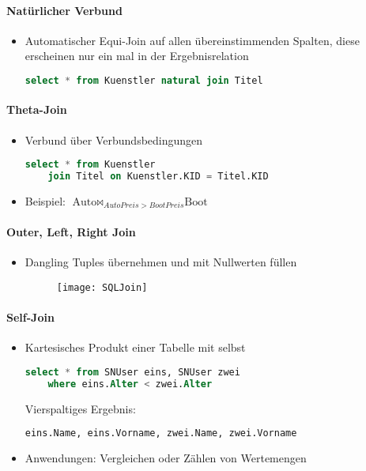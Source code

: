 \paragraph{Natürlicher Verbund}
\begin{itemize}
	\item Automatischer Equi-Join auf allen übereinstimmenden Spalten, diese erscheinen nur ein mal in der Ergebnisrelation
	\begin{lstlisting}[language=sql]
select * from Kuenstler natural join Titel
	\end{lstlisting}
\end{itemize}

\paragraph{Theta-Join}
\begin{itemize}
	\item Verbund über Verbundsbedingungen
	\begin{lstlisting}[language=sql]
select * from Kuenstler 
	join Titel on Kuenstler.KID = Titel.KID
	\end{lstlisting}
	\item Beispiel: \(  \text{Auto} \bowtie_{AutoPreis > BootPreis} \text{Boot} \)
\end{itemize}

\paragraph{Outer, Left, Right Join}
\begin{itemize}
	\item Dangling Tuples übernehmen und mit Nullwerten füllen
	\begin{figure}[H]\centering\label{SQLJoin}\texttt{[image: SQLJoin]}\end{figure}
\end{itemize}

\paragraph{Self-Join}
\begin{itemize}
	\item Kartesisches Produkt einer Tabelle mit selbst
	\begin{lstlisting}[language=sql] 
	select * from SNUser eins, SNUser zwei
	where eins.Alter < zwei.Alter
	\end{lstlisting}
	Vierspaltiges Ergebnis:
	\begin{lstlisting}[language=sql]
eins.Name, eins.Vorname, zwei.Name, zwei.Vorname
	\end{lstlisting}
	\item Anwendungen: Vergleichen oder Zählen von Wertemengen
\end{itemize}



